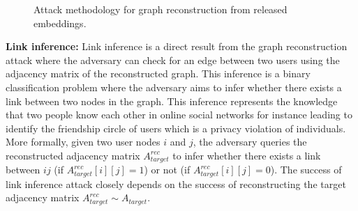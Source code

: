 \begin{figure}[t]
    \centering
    \begin{minipage}[b]{1\linewidth}
    \centering


    \end{minipage}
\vspace{-2mm}
    \caption{Attack methodology for graph reconstruction from released embeddings.}
    \label{fig:recattack}
\vspace{-1mm}
\end{figure}


\noindent\textbf{Link inference:}
Link inference is a direct result from the graph reconstruction attack where the adversary can check for an edge between two users using the adjacency matrix of the reconstructed graph.
This inference is a binary classification problem where the adversary aims to infer whether there exists a link between two nodes in the graph.
This inference represents the knowledge that two people know each other in online social networks for instance leading to identify the friendship circle of users which is a privacy violation of individuals.
More formally, given two user nodes $i$ and $j$, the adversary queries the reconstructed adjacency matrix $A_{target}^{rec}$ to infer whether there exists a link between $ij$ (if $A_{target}^{rec}[i][j] = 1$) or not (if $A_{target}^{rec}[i][j] = 0$).
The success of link inference attack closely depends on the success of reconstructing the target adjacency matrix $A_{target}^{rec} \sim A_{target}$.


